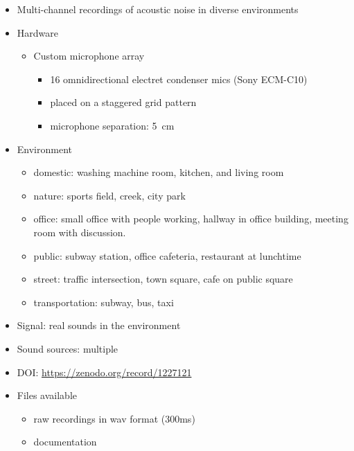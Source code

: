 \documentclass[14pt, oneside]{extarticle}
\begin{document}
\begin{itemize}

\item Multi-channel recordings of acoustic noise in diverse environments \cite{thiemann2013demand}

\item Hardware
	\begin{itemize}
	\item Custom microphone array
		\begin{itemize}
		\item 16 omnidirectional electret condenser mics (Sony ECM-C10) 
		\item placed on a staggered grid pattern 
		\item microphone separation: \SI{5}{\centi\metre}
		\end{itemize}
	\end{itemize}

\item Environment
	\begin{itemize}
	\item domestic: washing machine room, kitchen, and living room
	\item nature: sports field, creek, city park
	\item office: small office with people working, hallway in office building, meeting room with discussion.
	\item public: subway station, office cafeteria, restaurant at lunchtime
	\item street: traffic intersection, town square, cafe on public square
	\item transportation: subway, bus, taxi
	\end{itemize}

\item Signal: real sounds in the environment

\item Sound sources: multiple

\item DOI: \href{10.5281/zenodo.1227121}{https://zenodo.org/record/1227121} 

\item Files available
	\begin{itemize}
	\item raw recordings in wav format (300ms)
	\item documentation
	\end{itemize}

\end{itemize}



\end{document}
